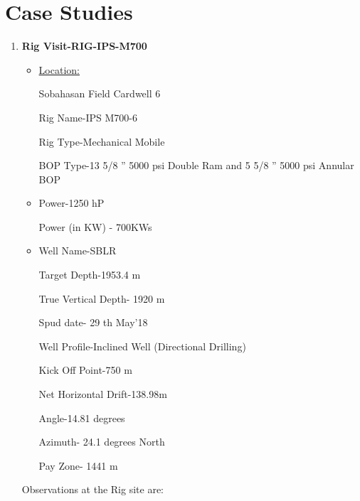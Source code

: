 \chapter{Case Studies}


\begin{enumerate}

\item \textbf{Rig Visit-RIG-IPS-M700}

\begin{itemize}

\item \underline{Location:} 

Sobahasan Field Cardwell 6

Rig Name-IPS M700-6

Rig Type-Mechanical Mobile

BOP Type-13 5/8 ” 5000 psi Double Ram and 5 5/8 ” 5000 psi Annular BOP

\vspace{1em}

\item {}

Power-1250 hP

Power (in KW) - 700KWs

\vspace{1em}

\item {}

Well Name-SBLR

Target Depth-1953.4 m

True Vertical Depth- 1920 m

Spud date- 29 th May’18

Well Profile-Inclined Well (Directional Drilling)

Kick Off Point-750 m

Net Horizontal Drift-138.98m

Angle-14.81 degrees

Azimuth- 24.1 degrees North

Pay Zone- 1441 m

\end{itemize}


\noindent Observations at the Rig site are:


\end{enumerate}
